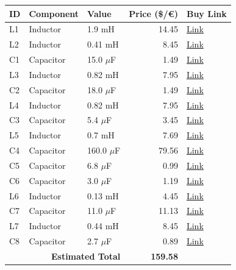 \documentclass[11pt,a4paper]{report}
\begin{document}
\vspace{0.5cm}
\begin{table}[H]
    \centering
    \renewcommand{\arraystretch}{1.5}
    \begin{tabular}{@{}lllrl@{}}
        \toprule
        \textbf{ID} & \textbf{Component} & \textbf{Value} & \textbf{Price (\$/€)} & \textbf{Buy Link} \\
        \midrule
        L1 & Inductor & 1.9 mH & 14.45 & \href{https://www.soundimports.eu/en/jantzen-audio-000-2038.html}{Link} \\
        L2 & Inductor & 0.41 mH & 8.45 & \href{https://www.soundimports.eu/en/jantzen-audio-000-1303.html}{Link} \\
        C1 & Capacitor & 15.0 $\mu$F & 1.49 & \href{https://www.soundimports.eu/en/jantzen-audio-001-6141.html}{Link} \\
        L3 & Inductor & 0.82 mH & 7.95 & \href{https://www.soundimports.eu/en/jantzen-audio-000-2192.html}{Link} \\
        C2 & Capacitor & 18.0 $\mu$F & 1.49 & \href{https://www.soundimports.eu/en/jantzen-audio-001-6144.html}{Link} \\
        L4 & Inductor & 0.82 mH & 7.95 & \href{https://www.soundimports.eu/en/jantzen-audio-000-2192.html}{Link} \\
        C3 & Capacitor & 5.4 $\mu$F & 3.45 & \href{https://www.soundimports.eu/en/jantzen-audio-001-0253.html}{Link} \\
        L5 & Inductor & 0.7 mH & 7.69 & \href{https://www.parts-express.com/Dayton-Audio-LW18-70-0.70mH-18-AWG-Perfect-Layer-Inductor-257-820}{Link} \\
        C4 & Capacitor & 160.0 $\mu$F & 79.56 & \href{https://www.parts-express.com/Solen-160uF-400V-Polypropylene-Capacitor-027-626}{Link} \\
        C5 & Capacitor & 6.8 $\mu$F & 0.99 & \href{https://www.soundimports.eu/en/jantzen-audio-001-6029.html}{Link} \\
        C6 & Capacitor & 3.0 $\mu$F & 1.19 & \href{https://www.parts-express.com/Solen-3.0uF-400V-Polypropylene-Capacitor-027-542}{Link} \\
        L6 & Inductor & 0.13 mH & 4.45 & \href{https://www.soundimports.eu/en/dayton-audio-lw18-13.html}{Link} \\
        C7 & Capacitor & 11.0 $\mu$F & 11.13 & \href{https://www.parts-express.com/Solen-11uF-400V-Polypropylene-Capacitor-027-571}{Link} \\
        L7 & Inductor & 0.44 mH & 8.45 & \href{https://www.soundimports.eu/en/jantzen-audio-000-1191.html}{Link} \\
        C8 & Capacitor & 2.7 $\mu$F & 0.89 & \href{https://www.parts-express.com/2.7uF-100V-Non-Polarized-Capacitor-027-326}{Link} \\
        \midrule
        \multicolumn{3}{r}{\textbf{Estimated Total}} & \textbf{159.58} & \\
        \bottomrule
    \end{tabular}
\end{table}
\end{document}
